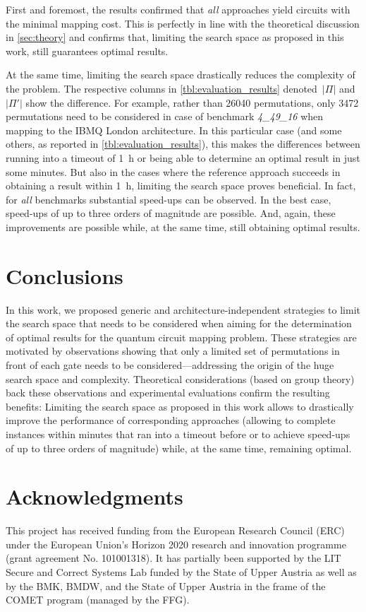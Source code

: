 \documentclass[10pt,conference]{IEEEtran}
\begin{document}
First and foremost, the results confirmed that \emph{all} approaches yield circuits with the minimal mapping cost. This is perfectly in line with the theoretical discussion in \autoref{sec:theory} and confirms that, limiting the search space as proposed in this work, still guarantees optimal results. 


At the same time, limiting the search space drastically reduces the complexity of the problem. The respective columns in \autoref{tbl:evaluation_results} denoted~$|\Pi|$ and~$|\Pi'|$ show the difference. For example, rather than \num{26040} permutations, only \num[group-minimum-digits=4]{3472} permutations need to be considered in case of benchmark \emph{4\_49\_16} when mapping to the IBMQ London architecture. 
In this particular case (and some others, as reported in \autoref{tbl:evaluation_results}), this makes the differences between  running into a timeout of \SI{1}{\hour} or being able to determine an optimal result in just some minutes. But also in the cases where the reference approach succeeds in obtaining a result within \SI{1}{\hour}, limiting the search space proves beneficial. In fact, for \emph{all} benchmarks substantial speed-ups can be observed. 
In the best case, speed-ups of up to three orders of magnitude are possible.
And, again, these improvements are possible while, at the same time, still obtaining optimal results. 

\section{Conclusions}
\label{sec:conclusions}

In this work, we proposed generic and \mbox{architecture-independent} strategies to limit the search space that needs to be considered when aiming for the determination of optimal results for the quantum circuit mapping problem. 
These strategies are motivated by observations showing that only a limited set of permutations in front of each gate needs to be considered---addressing the origin of the huge search space and complexity.
Theoretical considerations (based on group theory) back these observations and experimental evaluations confirm the resulting benefits: Limiting the search space as proposed in this work allows to drastically improve the performance of corresponding approaches (allowing to complete instances within minutes that ran into a timeout before or to achieve speed-ups of up to three orders of magnitude) while, at the same time, remaining optimal. 


\section*{Acknowledgments}
This project has received funding from the European Research Council (ERC) under the European Union’s Horizon 2020 research and innovation programme (grant agreement No. 101001318).
It has partially been supported by the LIT Secure and Correct Systems Lab funded by the State of Upper Austria as well as by the BMK, BMDW, and the State of Upper Austria in the frame of the COMET program (managed by the FFG).

\printbibliography
\end{document}

